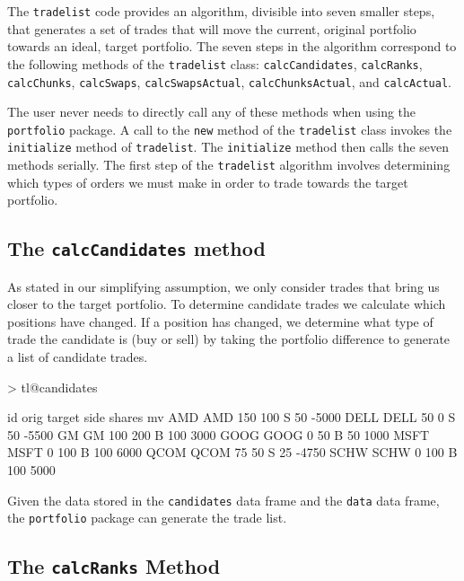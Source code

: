 \documentclass{article}
\begin{document}
The \texttt{tradelist} code provides an algorithm, divisible into
seven smaller steps, that generates a set of trades that will move the
current, original portfolio towards an ideal, target portfolio.  The
seven steps in the algorithm correspond to the following methods of
the \texttt{tradelist} class: \texttt{calcCandidates},
\texttt{calcRanks}, \texttt{calcChunks}, \texttt{calcSwaps},
\texttt{calcSwapsActual}, \texttt{calcChunksActual}, and
\texttt{calcActual}. 

The user never needs to directly call any of these methods when using
the \texttt{portfolio} package.  A call to the \texttt{new} method of
the \texttt{tradelist} class invokes the \texttt{initialize} method of
\texttt{tradelist}.  The \texttt{initialize} method then calls the
seven methods serially.  The first step of the \texttt{tradelist}
algorithm involves determining which types of orders we must make in
order to trade towards the target portfolio.

\subsection{The \texttt{calcCandidates} method}
\label{the calcCandidates method}

As stated in our simplifying assumption, we only consider trades that
bring us closer to the target portfolio. To determine candidate trades
we calculate which positions have changed.  If a position has changed,
we determine what type of trade the candidate is (buy or sell) by
taking the portfolio difference to generate a list of candidate
trades.

\begin{Schunk}
\begin{Sinput}
> tl@candidates
\end{Sinput}
\begin{Soutput}
       id orig target side shares    mv
AMD   AMD  150    100    S     50 -5000
DELL DELL   50      0    S     50 -5500
GM     GM  100    200    B    100  3000
GOOG GOOG    0     50    B     50  1000
MSFT MSFT    0    100    B    100  6000
QCOM QCOM   75     50    S     25 -4750
SCHW SCHW    0    100    B    100  5000
\end{Soutput}
\end{Schunk}

Given the data stored in the \texttt{candidates} data frame and the
\texttt{data} data frame, the \texttt{portfolio} package can generate
the trade list.

\subsection{The \texttt{calcRanks} Method}
\label{calcranks}
\label{the calcRanks method}
\end{document}
